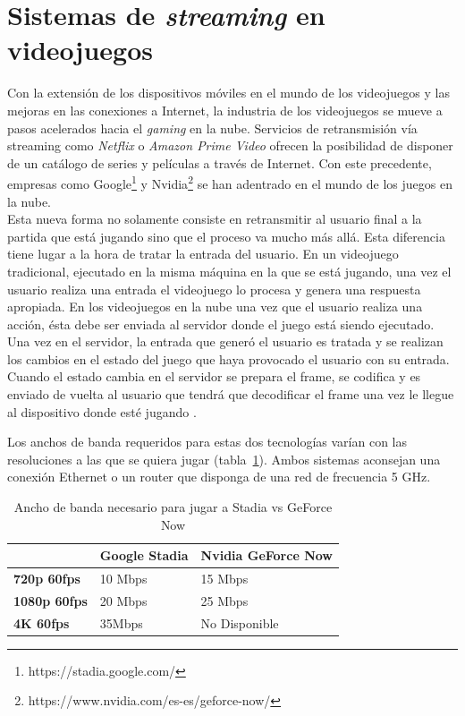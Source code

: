 \section{Sistemas de \textit{streaming} en videojuegos}

Con la extensi\'on de los dispositivos m\'oviles en el mundo de los videojuegos y las mejoras en las conexiones a Internet, la industria de los videojuegos se mueve a pasos acelerados hacia el \textit{gaming} en la nube. Servicios de retransmisi\'on v\'ia streaming como \textit{Netflix} o \textit{Amazon Prime Video} ofrecen la posibilidad de disponer de un cat\'alogo de series y pel\'iculas a trav\'es de Internet. Con este precedente, empresas como Google\footnote{https://stadia.google.com/} y Nvidia\footnote{https://www.nvidia.com/es-es/geforce-now/} se han adentrado en el mundo de los juegos en la nube.\\

Esta nueva forma no solamente consiste en retransmitir al usuario final a la partida que est\'a jugando sino que el proceso va mucho m\'as all\'a. Esta diferencia tiene lugar a la hora de tratar la entrada del usuario. En un videojuego tradicional, ejecutado en la misma m\'aquina en la que se est\'a jugando, una vez el usuario realiza una entrada el videojuego lo procesa y genera una respuesta apropiada. En los videojuegos en la nube una vez que el usuario realiza una acci\'on, \'esta debe ser enviada al servidor donde el juego est\'a siendo ejecutado. Una vez en el servidor, la entrada que gener\'o el usuario es tratada y se realizan los cambios en el estado del juego que haya provocado el usuario con su entrada. Cuando el estado cambia en el servidor se prepara el frame, se codifica y es enviado de vuelta al usuario que tendr\'a que decodificar el frame una vez le llegue al dispositivo donde est\'e jugando \citep{cloudgaming}.

Los anchos de banda requeridos para estas dos tecnolog\'ias var\'ian con las resoluciones a las que se quiera jugar (tabla~\ref{stadiovsgeforce}). Ambos sistemas aconsejan una conexi\'on Ethernet o un router que disponga de una red de frecuencia 5 GHz.

\begin{table}[h]
    \begin{tabular}{lll}
        \toprule
         & \textbf{Google Stadia} & \textbf{Nvidia GeForce Now} \\
        \midrule
        \textbf{720p 60fps} & 10 Mbps & 15 Mbps\\
        \textbf{1080p 60fps} & 20 Mbps & 25 Mbps \\
		\textbf{4K 60fps} & 35Mbps & No Disponible \\
        \bottomrule
    \end{tabular}
\caption{Ancho de banda necesario para jugar a Stadia vs GeForce Now}
\label{stadiovsgeforce}
\end{table}


